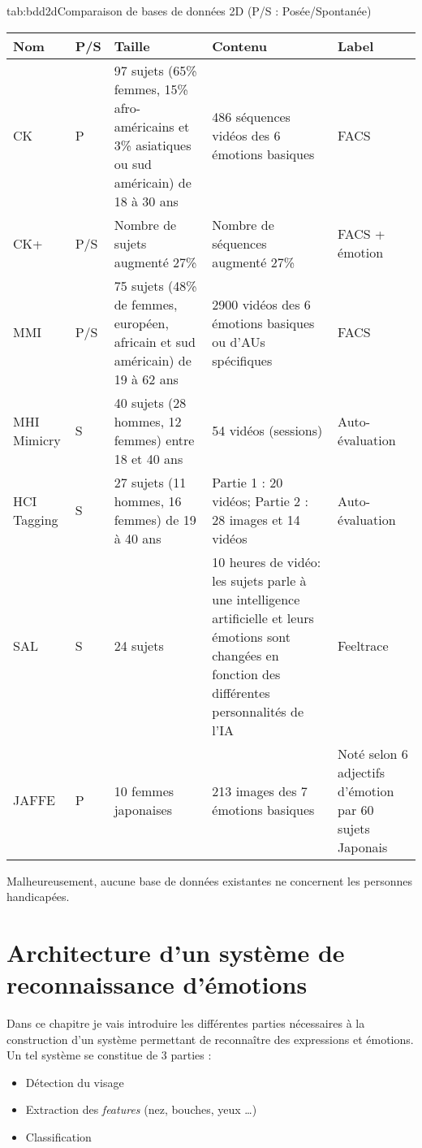 \documentclass[poster]{polytech/polytech}
\begin{document}
\begin{Table}{tab:bdd2d}{Comparaison de bases de données 2D (P/S : Posée/Spontanée)}
	\begin{tabular}{|p{1.5cm}|p{0.7cm}|p{4cm}|p{5cm}|p{2.5cm}|}
		\hline
		\textbf{Nom} &\textbf{P/S} &\textbf{Taille} &\textbf{Contenu} &\textbf{Label}\\\hline
		CK\cite{ck} &P & 97 sujets (65\% femmes, 15\% afro-américains et 3\% asiatiques ou sud américain) de 18 à 30 ans &486 séquences vidéos des 6 émotions basiques & FACS\\
		CK+\cite{ckplus} &P/S &Nombre de sujets augmenté 27\% &Nombre de séquences augmenté 27\% &FACS + émotion\\
		MMI\cite{mmi1} \cite{mmi2} &P/S &75 sujets (48\% de femmes, européen, africain et sud américain) de 19 à 62 ans &2900 vidéos des 6 émotions basiques ou d'AUs spécifiques &FACS\\
		MHI Mimicry \cite{mimicry1}\cite{mimicry2} &S & 40 sujets (28 hommes, 12 femmes) entre 18 et 40 ans &54 vidéos (sessions) &Auto-évaluation\\
		HCI Tagging \cite{tagging1}\cite{tagging2} &S &27 sujets (11 hommes, 16 femmes) de 19 à 40 ans &Partie 1 : 20 vidéos; Partie 2 : 28 images et 14 vidéos &Auto-évaluation\\
		SAL \cite{sal} &S &24 sujets &10 heures de vidéo: les sujets parle à une intelligence artificielle et leurs émotions sont changées en fonction des différentes personnalités de l'IA &Feeltrace\\
		JAFFE\cite{jaffe} &P &10 femmes japonaises &213 images des 7 émotions basiques &Noté selon 6 adjectifs d'émotion par 60 sujets Japonais\\
		\hline
	\end{tabular}
\end{Table}

Malheureusement, aucune base de données existantes ne concernent les personnes handicapées.

\chapter{Architecture d'un système de reconnaissance d'émotions}
Dans ce chapitre je vais introduire les différentes parties nécessaires à la construction d'un système permettant de reconnaître des expressions et émotions.\\
Un tel système se constitue de 3 parties :
\begin{itemize}
\item Détection du visage
\item Extraction des \textit{features} (nez, bouches, yeux …)
\item Classification\\
\end{itemize}
\end{document}
